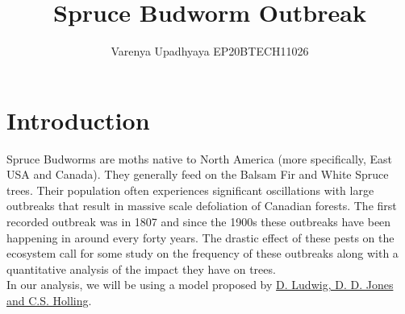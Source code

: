 \documentclass{article}
\begin{document}
\title{Spruce Budworm Outbreak}
\author{Varenya Upadhyaya EP20BTECH11026} 
\date{}
\maketitle

\section{Introduction}
Spruce Budworms are moths native to North America (more specifically, East USA and Canada). They generally feed on the Balsam Fir and White Spruce trees. Their population often experiences significant oscillations with large outbreaks that result in massive scale defoliation of Canadian forests. The first recorded outbreak was in 1807 and since the 1900s these outbreaks have been happening in around every forty years. The drastic effect of these pests on the ecosystem call for some study on the frequency of these outbreaks along with a quantitative analysis of the impact they have on trees.\\
In our analysis, we will be using a model proposed by \href{https://www.jstor.org/stable/3939?seq=1}{D. Ludwig, D. D. Jones and C.S. Holling}.\\
\end{document}
